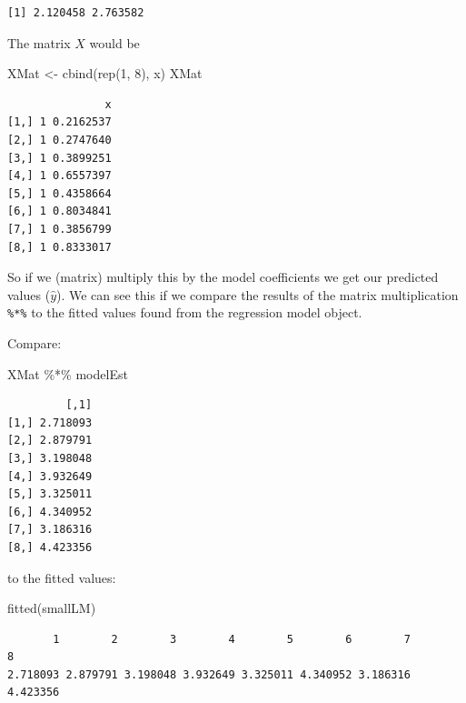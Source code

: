 \documentclass[
  oneside]{krantz}
\newenvironment{Shaded}{\begin{snugshade}}{\end{snugshade}}
\newcommand{\DecValTok}[1]{\textcolor[rgb]{0.00,0.00,0.81}{#1}}
\newcommand{\FunctionTok}[1]{\textcolor[rgb]{0.00,0.00,0.00}{#1}}
\newcommand{\NormalTok}[1]{#1}
\newcommand{\OtherTok}[1]{\textcolor[rgb]{0.56,0.35,0.01}{#1}}
\newcommand{\SpecialCharTok}[1]{\textcolor[rgb]{0.00,0.00,0.00}{#1}}
\begin{document}
\begin{verbatim}
[1] 2.120458 2.763582
\end{verbatim}

The matrix \emph{\(X\)} would be

\begin{Shaded}
\begin{Highlighting}[]
\NormalTok{XMat }\OtherTok{\textless{}{-}} \FunctionTok{cbind}\NormalTok{(}\FunctionTok{rep}\NormalTok{(}\DecValTok{1}\NormalTok{, }\DecValTok{8}\NormalTok{), x)}
\NormalTok{XMat}
\end{Highlighting}
\end{Shaded}

\begin{verbatim}
               x
[1,] 1 0.2162537
[2,] 1 0.2747640
[3,] 1 0.3899251
[4,] 1 0.6557397
[5,] 1 0.4358664
[6,] 1 0.8034841
[7,] 1 0.3856799
[8,] 1 0.8333017
\end{verbatim}

So if we (matrix) multiply this by the model coefficients we get our predicted values (\(\hat{y}\)). We can see this if we compare the results of the matrix multiplication \texttt{\%*\%} to the fitted values found from the regression model object.

Compare:

\begin{Shaded}
\begin{Highlighting}[]
\NormalTok{ XMat }\SpecialCharTok{\%*\%}\NormalTok{ modelEst}
\end{Highlighting}
\end{Shaded}

\begin{verbatim}
         [,1]
[1,] 2.718093
[2,] 2.879791
[3,] 3.198048
[4,] 3.932649
[5,] 3.325011
[6,] 4.340952
[7,] 3.186316
[8,] 4.423356
\end{verbatim}

to the fitted values:

\begin{Shaded}
\begin{Highlighting}[]
\FunctionTok{fitted}\NormalTok{(smallLM)}
\end{Highlighting}
\end{Shaded}

\begin{verbatim}
       1        2        3        4        5        6        7        8 
2.718093 2.879791 3.198048 3.932649 3.325011 4.340952 3.186316 4.423356 
\end{verbatim}
\end{document}
